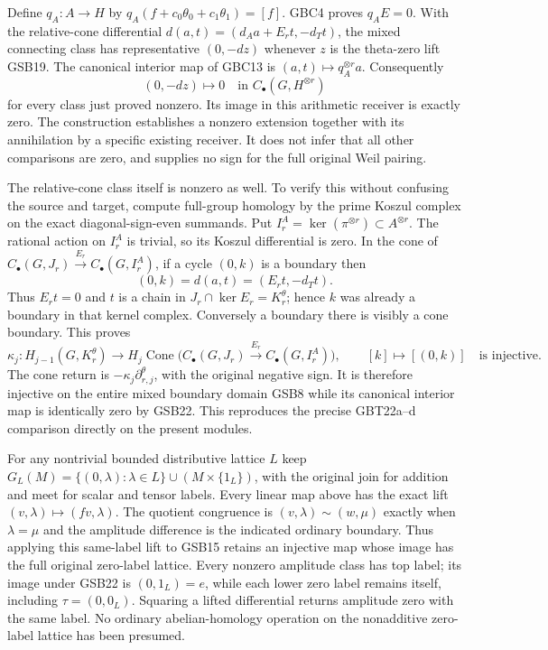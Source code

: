 Define $q_A:A\to H$ by
$q_A(f+c_0\theta_0+c_1\theta_1)=[f]$. GBC4 proves
$q_AE=0$. With the relative-cone differential
$d(a,t)=(d_Aa+E_rt,-d_Tt)$, the mixed connecting class has
representative $(0,-dz)$ whenever $z$ is the theta-zero lift
GSB19. The canonical interior map of GBC13 is
$(a,t)\mapsto q_A^{\otimes r}a$. Consequently
\begin{equation}\tag{GSB22}
(0,-dz)\longmapsto0\quad\text{in }C_\bullet(G,H^{\otimes r})
\end{equation}
for every class just proved nonzero. Its image in this arithmetic
receiver is exactly zero. The construction establishes a nonzero
extension together with its annihilation by a specific existing
receiver. It does not infer that all other comparisons are zero,
and supplies no sign for the full original Weil pairing.

The relative-cone class itself is nonzero as well. To verify this
without confusing the source and target, compute full-group homology
by the prime Koszul complex on the exact diagonal-sign-even
summands. Put $I_r^A=\ker(\pi^{\otimes r})\subset A^{\otimes r}$.
The rational action on $I_r^A$ is trivial, so its Koszul differential
is zero. In the cone of $C_\bullet(G,J_r)\xrightarrow{E_r}
C_\bullet(G,I_r^A)$, if a cycle $(0,k)$ is a boundary then
\[
(0,k)=d(a,t)=(E_rt,-d_Tt).
\]
Thus $E_rt=0$ and $t$ is a chain in $J_r\cap\ker E_r=K_r^\theta$;
hence $k$ was already a boundary in that kernel complex.
Conversely a boundary there is visibly a cone boundary. This proves
\begin{equation}\tag{GSB22a}
\kappa_j:H_{j-1}(G,K_r^\theta)\longrightarrow
 H_j\operatorname{Cone}\bigl(C_\bullet(G,J_r)
                       \xrightarrow{E_r}C_\bullet(G,I_r^A)\bigr),
\qquad[k]\longmapsto[(0,k)]
\quad\text{is injective}.
\end{equation}
The cone return is $-\kappa_j\partial^\theta_{r,j}$, with the
original negative sign. It is therefore injective on the entire
mixed boundary domain GSB8 while its canonical interior map is
identically zero by GSB22. This reproduces the precise GBT22a--d
comparison directly on the present modules.

For any nontrivial bounded distributive lattice $L$ keep
$G_L(M)=\{(0,\lambda):\lambda\in L\}\cup(M\times\{1_L\})$,
with the original join for addition and meet for scalar and tensor
labels. Every linear map above has the exact lift
$(v,\lambda)\mapsto(fv,\lambda)$. The quotient congruence is
$(v,\lambda)\sim(w,\mu)$ exactly when $\lambda=\mu$ and the
amplitude difference is the indicated ordinary boundary. Thus
applying this same-label lift to GSB15 retains an injective map
whose image has the full original zero-label lattice. Every
nonzero amplitude class has top label; its image under GSB22 is
$(0,1_L)=e$, while each lower zero label remains itself, including
$\tau=(0,0_L)$. Squaring a lifted differential returns amplitude
zero with the same label. No ordinary abelian-homology operation
on the nonadditive zero-label lattice has been presumed.

